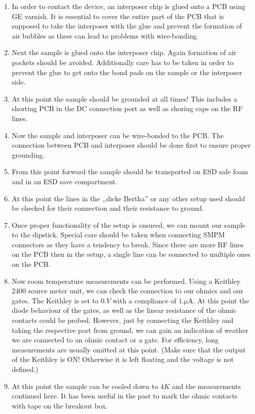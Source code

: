 \begin{appendix}
\begin{enumerate}
\item{In order to contact the device, an interposer chip is glued onto a PCB using GE varnish. It is essential to cover the entire part of the PCB that is supposed to take the interposer with the glue and prevent the formation of air bubbles as these can lead to problems with wire-bonding.}
\item{Next the sample is glued onto the interposer chip. Again formation of air pockets should be avoided. Additionally care has to be taken in order to prevent the glue to get onto the bond pads on the sample or the interposer side.}
\item{At this point the sample should be grounded at all times! This includes a shorting PCB in the DC connection port as well as shoring caps on the RF lines.}
\item{Now the sample and interposer can be wire-bonded to the PCB. The connection between PCB and interposer should be done first to ensure proper grounding.}
\item{From this point forward the sample should be transported on ESD safe foam and in an ESD save compartment. }
\item{At this point the lines in the ,,dicke Bertha'' or any other setup used should be checked for their connection and their resistance to ground.}
\item{Once proper functionality of the setup is ensured, we can mount our sample to the dipstick. Special care should be taken when connecting SMPM connectors as they have a tendency to break. Since there are more RF lines on the PCB then in the setup, a single line can be connected to multiple ones on the PCB.}
\item{Now room temperature measurements can be performed. Using a Keithley 2400 source meter unit, we can check the connection to our ohmics and our gates. The Keithley is set to $ \si{0.V}$} with a compliance of $\si{1.\micro\ampere}$. At this point the diode behaviour of the gates, as well as the linear resistance of the ohmic contacts could be probed.
However, just by connecting the Keithley and taking the respective port from ground, we can gain an indication of weather we are connected to an ohmic contact or a gate. For efficiency, long measurements are usually omitted at this point. (Make sure that the output of the Keithley is ON! Otherwise it is left floating and the voltage is not defined.) 
\item At this point the sample can be cooled down to $\si{4K}$ and the measurements continued here. It has been useful in the past to mark the ohmic contacts with tape on the breakout box.

\end{enumerate}
\end{appendix}
